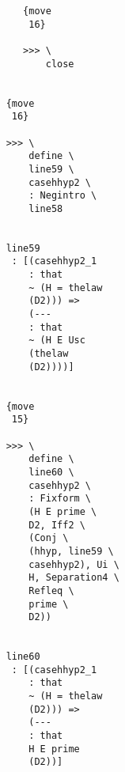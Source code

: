 \documentclass[12pt]{article}
\begin{document}
\begin{verbatim}
                                                   {move 
                                                    16}

                                                   >>> \
                                                       close


                                                {move 
                                                 16}

                                                >>> \
                                                    define \
                                                    line59 \
                                                    casehhyp2 \
                                                    : Negintro \
                                                    line58


                                                line59 
                                                 : [(casehhyp2_1 
                                                    : that 
                                                    ~ (H = thelaw 
                                                    (D2))) => 
                                                    (--- 
                                                    : that 
                                                    ~ (H E Usc 
                                                    (thelaw 
                                                    (D2))))]


                                                {move 
                                                 15}

                                                >>> \
                                                    define \
                                                    line60 \
                                                    casehhyp2 \
                                                    : Fixform \
                                                    (H E prime \
                                                    D2, Iff2 \
                                                    (Conj \
                                                    (hhyp, line59 \
                                                    casehhyp2), Ui \
                                                    H, Separation4 \
                                                    Refleq \
                                                    prime \
                                                    D2))


                                                line60 
                                                 : [(casehhyp2_1 
                                                    : that 
                                                    ~ (H = thelaw 
                                                    (D2))) => 
                                                    (--- 
                                                    : that 
                                                    H E prime 
                                                    (D2))]



\end{verbatim}
\end{document}
